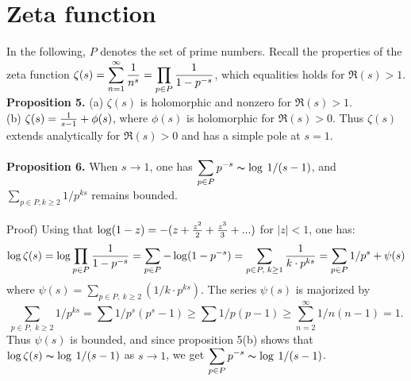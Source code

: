 \documentclass[11pt]{article}
\begin{document}
\section{Zeta function}
In the following, $P$ denotes the set of prime numbers. Recall the properties of the zeta function $\zeta(s)=\displaystyle\sum_{n=1}^{\infty} {1\over n^s}=\displaystyle\prod_{p\in P} {1\over 1-p^{-s}}$, which equalities holds for $\Re(s)>1$.
\vspace{7mm}
\\
\textbf{Proposition 5.}
(a) $\zeta(s)$ is holomorphic and nonzero for $\Re(s)>1$. \\
(b) $\zeta(s)={1\over s-1}+\phi(s)$, where $\phi(s)$ is holomorphic for $\Re(s)>0$. Thus $\zeta(s)$ extends analytically for $\Re(s)>0$ and has a simple pole at $s=1$.
\\
\\
\textbf{Proposition 6.}
When $s\rightarrow 1$, one has $\displaystyle\sum_{p\in P}p^{-s}\thicksim \log\:1/(s-1)$, and $\displaystyle\sum_{p\in P, k\geq2}1/p^{ks}$ remains bounded.
\\
\\
Proof) Using that $\log(1-z)=-(z+{z^2\over2}+{z^3\over3}+...)$ for $|z|<1$, one has:
\begin{equation*}
\log\zeta(s)=\log\displaystyle\prod_{p\in P} {1\over 1-p^{-s}}=\displaystyle\sum_{p\in P}-\log(1-p^{-s})=\displaystyle\sum_{p\in P,\; k\geq1}{1\over k\cdot p^{ks}}=\displaystyle\sum_{p\in P}1/p^s+\psi(s)
\end{equation*}
where $\psi(s)=\displaystyle\sum_{p\in P,\; k\geq2}(1/k\cdot p^{ks})$. The series $\psi(s)$ is majorized by
\begin{equation*}
\displaystyle\sum_{p\in P,\; k\geq2}1/p^{ks}=\sum{1/p^s(p^s-1)}\geq\sum1/p(p-1)\geq\displaystyle\sum_{n=2}^{\infty}1/n(n-1)=1.
\end{equation*}
Thus $\psi(s)$ is bounded, and since proposition 5(b) shows that $\log\zeta(s)\thicksim \log\:1/(s-1)$ as $s\rightarrow 1$, we get $\displaystyle\sum_{p\in P}p^{-s}\thicksim \log\:1/(s-1)$.
\vspace{10mm}
\end{document}
